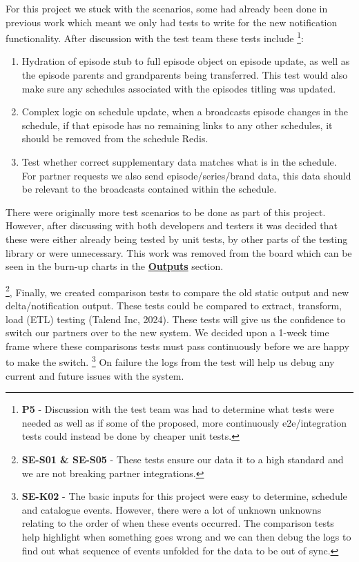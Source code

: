   For this project we stuck with the scenarios, some had already been done in previous work which meant we only had tests to write for the new 
  notification functionality. After discussion with the test team these tests include
  \footnote{\textbf{P5} - Discussion with the test team was had to determine what tests were needed as well as if some of the proposed, more continuously
  e2e/integration tests could instead be done by cheaper unit tests.}:

  \begin{enumerate}
    \item Hydration of episode stub to full episode object on episode update, as well as the episode parents and grandparents being transferred. This
    test would also make sure any schedules associated with the episodes titling was updated.
    \item Complex logic on schedule update, when a broadcasts episode changes in the schedule, if that episode has no remaining links to any other 
    schedules, it should be removed from the schedule Redis.
    \item Test whether correct supplementary data matches what is in the schedule. For partner requests we also send episode/series/brand data, 
    this data should be relevant to the broadcasts contained within the schedule.
  \end{enumerate}

  There were originally more test scenarios to be done as part of this project. However, after discussing with both developers and testers it was decided 
  that these were either already being tested by unit tests, by other parts of the testing library or were unnecessary. This work was removed from 
  the board which can be seen in the burn-up charts in the \hyperref[sec:burnup]{\textbf{Outputs}} section.

  \footnote{\textbf{SE-S01 \& SE-S05} - These tests ensure our data it to a high standard and we are not breaking partner integrations.}, 
  Finally, we created comparison tests to compare the old static output and new delta/notification output. These tests could be compared to extract, transform, 
  load (ETL) testing (Talend Inc, 2024). These tests will give us the confidence to switch our partners over to the new system. We decided upon a 1-week time 
  frame where these comparisons tests must pass continuously before we are happy to make the switch. 
  \footnote{\textbf{SE-K02} - The basic inputs for this project were easy to determine, schedule and catalogue events. However, there were a lot of unknown unknowns 
  relating to the order of when these events occurred. The comparison tests help highlight when something goes wrong and we can then debug the logs to 
  find out what sequence of events unfolded for the data to be out of sync.}
  On failure the logs from the test will help us debug any current and future issues with the system.

  \newpage